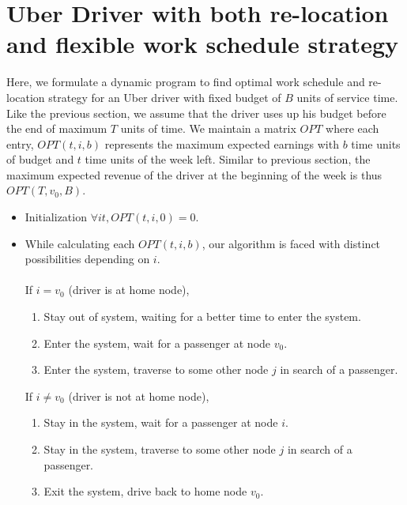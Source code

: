 \section{Uber Driver with both re-location and flexible work schedule strategy}

Here, we formulate a dynamic program to find optimal work schedule and re-location strategy for an Uber driver with fixed budget of $B$ units of service time. Like the previous section, we assume that the driver uses up his budget before the end of maximum $T$ units of time. We maintain a matrix $OPT$ where each entry, $OPT(t, i, b)$ represents the maximum expected earnings with $b$ time units of budget and $t$ time units of the week left. Similar to previous section, the maximum expected revenue of the driver at the beginning of the week is thus $OPT(T, v_0, B)$.
\begin{itemize}
\item Initialization
        $\forall it, OPT(t, i, 0)=0$.
\item While calculating each $OPT(t, i, b)$, our algorithm is faced with distinct possibilities depending on $i$. \\ \\
If $i=v_0$ (driver is at home node),
    \begin{enumerate}
    \item Stay out of system, waiting for a better time to enter the system.
    \item Enter the system, wait for a passenger at node $v_0$.
    \item Enter the system, traverse to some other node $j$ in search of a passenger.
    \end{enumerate}
If $i \neq v_0$ (driver is not at home node),
    \begin{enumerate}
    \item Stay in the system, wait for a passenger at node $i$.
    \item Stay in the system, traverse to some other node $j$ in search of a passenger.
    \item Exit the system, drive back to home node $v_0$.
    \end{enumerate}
    

\end{itemize}
